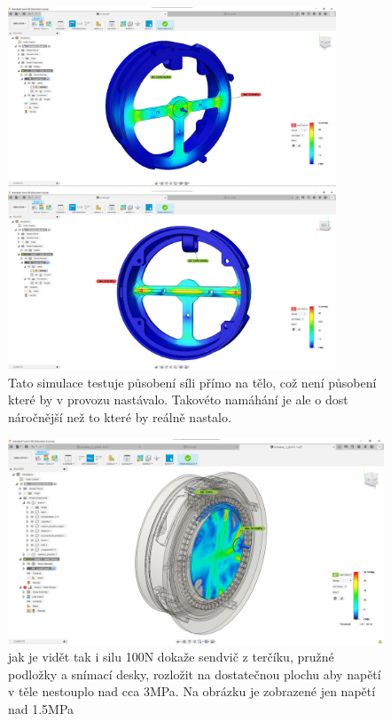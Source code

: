 \begin{figure}[htbp]
    \centering
    \includegraphics[width=370]{kapitoly/obrazky/E4/machanika_tlakove_desky/simulace/F100N,primo,uprostred,pohled_zepredu.png}
    \caption{}
    \includegraphics[width=370]{kapitoly/obrazky/E4/machanika_tlakove_desky/simulace/F100N,primo,uprostred,pohled_zezadu.png}
    \caption{Tato simulace testuje působení síli přímo na tělo, což není působení které by v provozu nastávalo. Takovéto namáhání je ale o dost náročnější než to které by reálně nastalo.}
    \label{fig:simulace1}
\end{figure}

\begin{figure}[htbp]
    \centering
    \includegraphics[width=\textwidth]{kapitoly/obrazky/E4/machanika_tlakove_desky/simulace/zjednodusena_sestava_pri_F100N_nezobrazeno_napeti_pod_1,5MPa.png}
    \caption{jak je vidět tak i silu 100N dokaže sendvič z terčíku, pružné podložky a snímací desky, rozložit na dostatečnou plochu aby napětí v těle nestouplo nad cca 3MPa. Na obrázku je zobrazené jen napětí nad 1.5MPa}
    \label{fig:M1}
\end{figure}

\clearpage
\newpage